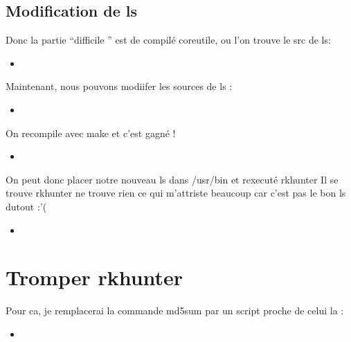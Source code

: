 \documentclass[10pt,a4paper]{article}
\newcommand{\insertcode}[2]{\begin{itemize}\item[]\end{itemize}}
\begin{document}
\subsection{Modification de ls}
Donc la partie ``difficile '' est de compilé coreutile, ou l'on trouve le src de ls:
\insertcode{commande/installls.txt}{Compilation}

Maintenant, nous pouvons modiifer les sources de ls :
\insertcode{commande/diffls.txt}{Ls custom}
On recompile avec make et c'est gagné !
\insertcode{commande/lsstdout.txt}{Ls custom stdout}
On peut donc placer notre nouveau ls dans /usr/bin et rexecuté rkhunter
Il se trouve rkhunter ne trouve rien ce qui m'attriste  beaucoup car c'est pas le bon ls dutout :'(
\insertcode{commande/md5sum.txt}{Triste}

\section{Tromper rkhunter}
Pour ca, je remplacerai la commande md5sum par un script proche de celui la :
\insertcode{commande/sha.sh}{sha256sum}
\end{document}

